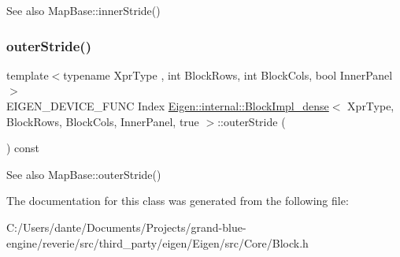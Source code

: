 \begin{DoxySeeAlso}{See also}
Map\+Base\+::inner\+Stride() 
\end{DoxySeeAlso}
\mbox{\label{class_eigen_1_1internal_1_1_block_impl__dense_3_01_xpr_type_00_01_block_rows_00_01_block_cols_00_01_inner_panel_00_01true_01_4_ac6f37b9a06897f0891fcd7b65ce2800e}} 
\subsubsection{\texorpdfstring{outerStride()}{outerStride()}}
{\footnotesize\ttfamily template$<$typename Xpr\+Type , int Block\+Rows, int Block\+Cols, bool Inner\+Panel$>$ \\
E\+I\+G\+E\+N\+\_\+\+D\+E\+V\+I\+C\+E\+\_\+\+F\+U\+NC Index \mbox{\hyperlink{class_eigen_1_1internal_1_1_block_impl__dense}{Eigen\+::internal\+::\+Block\+Impl\+\_\+dense}}$<$ Xpr\+Type, Block\+Rows, Block\+Cols, Inner\+Panel, true $>$\+::outer\+Stride (\begin{DoxyParamCaption}{ }\end{DoxyParamCaption}) const\hspace{0.3cm}{\ttfamily [inline]}}

\begin{DoxySeeAlso}{See also}
Map\+Base\+::outer\+Stride() 
\end{DoxySeeAlso}


The documentation for this class was generated from the following file\+:\begin{DoxyCompactItemize}
\item 
C\+:/\+Users/dante/\+Documents/\+Projects/grand-\/blue-\/engine/reverie/src/third\+\_\+party/eigen/\+Eigen/src/\+Core/Block.\+h\end{DoxyCompactItemize}

